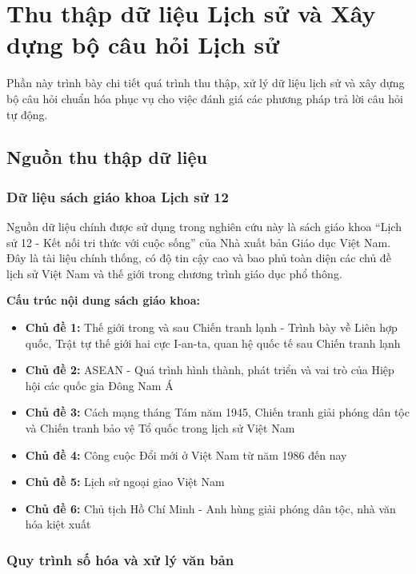 \section{Thu thập dữ liệu Lịch sử và Xây dựng bộ câu hỏi Lịch sử}
\label{sec:experiment1}

Phần này trình bày chi tiết quá trình thu thập, xử lý dữ liệu lịch sử và xây dựng bộ câu hỏi chuẩn hóa phục vụ cho việc đánh giá các phương pháp trả lời câu hỏi tự động.

\subsection{Nguồn thu thập dữ liệu}

\subsubsection{Dữ liệu sách giáo khoa Lịch sử 12}

Nguồn dữ liệu chính được sử dụng trong nghiên cứu này là sách giáo khoa ``Lịch sử 12 - Kết nối tri thức với cuộc sống'' của Nhà xuất bản Giáo dục Việt Nam. Đây là tài liệu chính thống, có độ tin cậy cao và bao phủ toàn diện các chủ đề lịch sử Việt Nam và thế giới trong chương trình giáo dục phổ thông.

\textbf{Cấu trúc nội dung sách giáo khoa:}
\begin{itemize}
    \item \textbf{Chủ đề 1:} Thế giới trong và sau Chiến tranh lạnh - Trình bày về Liên hợp quốc, Trật tự thế giới hai cực I-an-ta, quan hệ quốc tế sau Chiến tranh lạnh
    \item \textbf{Chủ đề 2:} ASEAN - Quá trình hình thành, phát triển và vai trò của Hiệp hội các quốc gia Đông Nam Á
    \item \textbf{Chủ đề 3:} Cách mạng tháng Tám năm 1945, Chiến tranh giải phóng dân tộc và Chiến tranh bảo vệ Tổ quốc trong lịch sử Việt Nam
    \item \textbf{Chủ đề 4:} Công cuộc Đổi mới ở Việt Nam từ năm 1986 đến nay
    \item \textbf{Chủ đề 5:} Lịch sử ngoại giao Việt Nam
    \item \textbf{Chủ đề 6:} Chủ tịch Hồ Chí Minh - Anh hùng giải phóng dân tộc, nhà văn hóa kiệt xuất
\end{itemize}

\subsubsection{Quy trình số hóa và xử lý văn bản}

